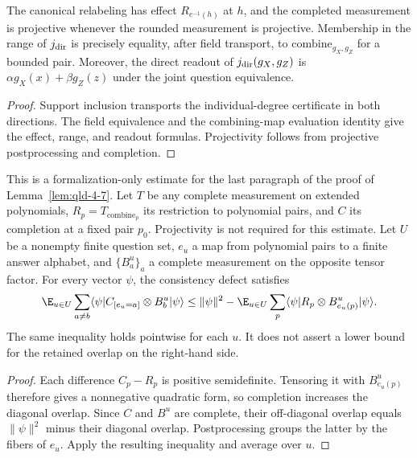 \begin{theorem}
	\label{thm:qld-direct-pair-completion-properties}
	\leanok
	The canonical relabeling has effect $R_{e^{-1}(h)}$ at $h$, and the completed
	measurement is projective whenever the rounded measurement is projective.
	Membership in the range of $j_{\rm dir}$ is precisely equality, after field
	transport, to $\mathrm{combine}_{g_X,g_Z}$ for a bounded pair. Moreover, the
	direct readout of $j_{\rm dir}(g_X,g_Z)$ is
	$\alpha g_X(x)+\beta g_Z(z)$ under the joint question equivalence.
\end{theorem}
\begin{proof}
	\leanok
	Support inclusion transports the individual-degree certificate in both
	directions. The field equivalence and the combining-map evaluation identity
	give the effect, range, and readout formulas. Projectivity follows from
	projective postprocessing and completion.
\end{proof}

\begin{lemma}
	\label{lem:qld-completed-pair-agreement}
	\leanok
	This is a formalization-only estimate for the last paragraph of the proof
	of Lemma~\ref{lem:qld-4-7}. Let $T$ be any complete measurement on extended
	polynomials, $R_p=T_{\mathrm{combine}_p}$ its restriction to polynomial
	pairs, and $C$ its completion at a fixed pair $p_0$. Projectivity is not
	required for this estimate. Let $U$ be a nonempty finite question set,
	$e_u$ a map from polynomial pairs to a finite answer alphabet, and
	$\{B^u_a\}_a$ a complete measurement on the opposite tensor factor.
	For every vector $\psi$, the consistency defect satisfies
	\[
		\E_{u\in U}\sum_{a\ne b}
		\langle\psi|C_{[e_u=a]}\otimes B^u_b|\psi\rangle
		\le \|\psi\|^2-
		\E_{u\in U}\sum_p
		\langle\psi|R_p\otimes B^u_{e_u(p)}|\psi\rangle.
	\]
	The same inequality holds pointwise for each $u$. It does not assert a
	lower bound for the retained overlap on the right-hand side.
\end{lemma}
\begin{proof}
	\leanok
	Each difference $C_p-R_p$ is positive semidefinite. Tensoring it with
	$B^u_{e_u(p)}$ therefore gives a nonnegative quadratic form, so
	completion increases the diagonal overlap. Since $C$ and $B^u$ are
	complete, their off-diagonal overlap equals $\|\psi\|^2$ minus their
	diagonal overlap. Postprocessing groups the latter by the fibers of $e_u$.
	Apply the resulting inequality and average over $u$.
\end{proof}

